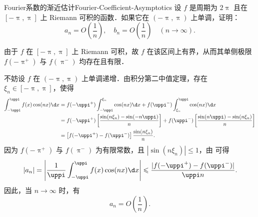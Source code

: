 \begin{problem}{Fourier系数的渐近估计}{Fourier-Coefficient-Asymptotics}
    设 $f$ 是周期为 $2\uppi$ 且在 $[-\uppi, \uppi]$ 上 Riemann 可积的函数．如果它在 $(-\uppi, \uppi)$ 上单调，证明：
    \begin{equation}
        a_n = O\left(\frac{1}{n}\right), \quad b_n = O\left(\frac{1}{n}\right) \quad (n \to \infty).
    \end{equation}
\end{problem}

\begin{myproof}
    由于 $f$ 在 $[-\uppi, \uppi]$ 上 Riemann 可积，故 $f$ 在该区间上有界，从而其单侧极限 $f(-\uppi^+)$ 与 $f(\uppi^-)$ 均存在且有限．

    不妨设 $f$ 在 $(-\uppi, \uppi)$ 上单调递增．由积分第二中值定理，存在 $\xi_n \in [-\uppi, \uppi]$，使得
    \begin{equation}\label{eq:an-integral-4}
        \begin{aligned}
            \int_{-\uppi}^{\uppi} f(x) \cos(nx) \d x & = f(-\uppi^+) \int_{-\uppi}^{\xi_n} \cos(nx) \d x + f(\uppi^-) \int_{\xi_n}^{\uppi} \cos(nx) \d x                                     \\
                                                     & = f(-\uppi^+) \left[ \frac{\sin(n\xi_n) - \sin(-n\uppi)}{n} \right] + f(\uppi^-) \left[ \frac{\sin(n\uppi) - \sin(n\xi_n)}{n} \right] \\
                                                     & = \left[ f(-\uppi^+) - f(\uppi^-) \right] \frac{\sin(n\xi_n)}{n}.
        \end{aligned}
    \end{equation}
    因为 $f(-\uppi^+)$ 与 $f(\uppi^-)$ 为有限常数，且 $|\sin(n\xi_n)| \leqslant 1$，由  可得
    \begin{equation}
        |a_n| = \left| \frac{1}{\uppi} \int_{-\uppi}^{\uppi} f(x) \cos(nx) \d x \right| \leqslant \frac{|f(-\uppi^+) - f(\uppi^-)|}{\uppi n}.
    \end{equation}
    因此，当 $n \to \infty$ 时，有
    \begin{equation}
        a_n = O\left(\frac{1}{n}\right).
    \end{equation}


\end{myproof}
